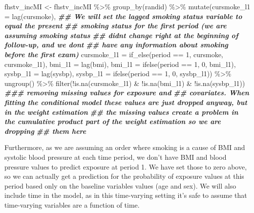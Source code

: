 \documentclass[
]{book}
\newenvironment{Shaded}{\begin{snugshade}}{\end{snugshade}}
\newcommand{\AttributeTok}[1]{\textcolor[rgb]{0.77,0.63,0.00}{#1}}
\newcommand{\DecValTok}[1]{\textcolor[rgb]{0.00,0.00,0.81}{#1}}
\newcommand{\DocumentationTok}[1]{\textcolor[rgb]{0.56,0.35,0.01}{\textbf{\textit{#1}}}}
\newcommand{\FunctionTok}[1]{\textcolor[rgb]{0.00,0.00,0.00}{#1}}
\newcommand{\NormalTok}[1]{#1}
\newcommand{\OtherTok}[1]{\textcolor[rgb]{0.56,0.35,0.01}{#1}}
\newcommand{\SpecialCharTok}[1]{\textcolor[rgb]{0.00,0.00,0.00}{#1}}
\begin{document}
\begin{Shaded}
\begin{Highlighting}[]
\NormalTok{fhstv\_incMI }\OtherTok{\textless{}{-}}\NormalTok{ fhstv\_incMI }\SpecialCharTok{\%\textgreater{}\%}
  \FunctionTok{group\_by}\NormalTok{(randid) }\SpecialCharTok{\%\textgreater{}\%}
  \FunctionTok{mutate}\NormalTok{(}\AttributeTok{cursmoke\_l1 =} \FunctionTok{lag}\NormalTok{(cursmoke),}
         \DocumentationTok{\#\# We will set the lagged smoking status variable to equal the present}
         \DocumentationTok{\#\# smoking status for the first period (we are assuming smoking status}
         \DocumentationTok{\#\# didn\textquotesingle{}t change right at the beginning of follow{-}up, and we don\textquotesingle{}t }
         \DocumentationTok{\#\# have any information about smoking before the first exam)}
         \AttributeTok{cursmoke\_l1 =} \FunctionTok{if\_else}\NormalTok{(period }\SpecialCharTok{==} \DecValTok{1}\NormalTok{, cursmoke, cursmoke\_l1), }
         \AttributeTok{bmi\_l1 =} \FunctionTok{lag}\NormalTok{(bmi),}
         \AttributeTok{bmi\_l1 =} \FunctionTok{ifelse}\NormalTok{(period }\SpecialCharTok{==} \DecValTok{1}\NormalTok{, }\DecValTok{0}\NormalTok{, bmi\_l1),}
         \AttributeTok{sysbp\_l1 =} \FunctionTok{lag}\NormalTok{(sysbp),}
         \AttributeTok{sysbp\_l1 =} \FunctionTok{ifelse}\NormalTok{(period }\SpecialCharTok{==} \DecValTok{1}\NormalTok{, }\DecValTok{0}\NormalTok{, sysbp\_l1)) }\SpecialCharTok{\%\textgreater{}\%}
  \FunctionTok{ungroup}\NormalTok{() }\SpecialCharTok{\%\textgreater{}\%} 
  \FunctionTok{filter}\NormalTok{(}\SpecialCharTok{!}\FunctionTok{is.na}\NormalTok{(cursmoke\_l1) }\SpecialCharTok{\&} \SpecialCharTok{!}\FunctionTok{is.na}\NormalTok{(bmi\_l1) }\SpecialCharTok{\&} \SpecialCharTok{!}\FunctionTok{is.na}\NormalTok{(sysbp\_l1)) }\DocumentationTok{\#\#\# removing missing values for exposure and }
\DocumentationTok{\#\# covariates. When fitting the conditional model these values are just dropped anyway, but in the weight estimation}
\DocumentationTok{\#\# the missing values create a problem in the cumulative product part of the weight estimation so we are dropping }
\DocumentationTok{\#\# them here}
\end{Highlighting}
\end{Shaded}

Furthermore, as we are assuming an order where smoking is a cause of BMI and systolic blood pressure at each time period, we don't have BMI and blood pressure values to predict exposure at period 1. We have set those to zero above, so we can actually get a prediction for the probability of exposure values at this period based only on the baseline variables values (age and sex). We will also include time in the model, as in this time-varying setting it's safe to assume that time-varying variables are a function of time.
\end{document}
